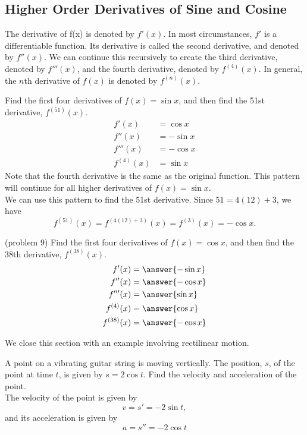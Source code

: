 \documentclass[handout]{ximera}
\begin{document}
\subsection{Higher Order Derivatives of Sine and Cosine}

The derivative of f(x) is denoted by $f'(x)$. In most circumstances, $f'$ is a differentiable function. Its derivative is called
 the second derivative, and denoted by $f''(x)$. 
 We can continue this recursively to create the third derivative, denoted by $f'''(x)$, and the fourth derivative, 
 denoted by $f^{(4)}(x)$.  In general, the $n$th derivative of $f(x)$ is denoted by $f^{(n)}(x)$. 

\begin{example}[example 9]
Find the first four derivatives of $f(x) = \sin x$, and then find the 51st derivative, $f^{(51)}(x)$.\\
\begin{align*}
f'(x) &= \cos x\\
f''(x) &= -\sin x\\
f'''(x) &= -\cos x\\
f^{(4)}(x) &= \sin x
\end{align*}  
Note that the fourth derivative is the same as the original function.  
This pattern will continue for all higher derivatives of $f(x) = \sin x$.  \\
We can use this pattern to find the 51st derivative.  Since $51 = 4(12) + 3$, we have
\[
f^{(51)}(x) = f^{(4(12)+3)}(x) = f^{(3)}(x) = -\cos x.
\]

  


\end{example}


\begin{problem}(problem 9)
Find the first four derivatives of $f(x) = \cos x$, and then find the 38th derivative, $f^{(38)}(x)$.
\begin{align}
f'(x) &= \answer{-\sin x}\\
f''(x) &= \answer{-\cos x}\\
f'''(x) &= \answer{\sin x}\\
f^{(4)}(x) &= \answer{\cos x}\\
f^{(38)}(x) &= \answer{-\cos x}
\end{align}

\end{problem}


We close this section with an example involving rectilinear motion.

\begin{example}
A point on a vibrating guitar string is moving vertically.
The position, $s$, of the point at time $t$, is given by $s = 2\cos t$.  Find the velocity and acceleration of the point.\\
The velocity of the point is given by 
\[
v = s' = -2\sin t,
\]
and its acceleration is given by 
\[
a = s'' = -2\cos t
\]

\end{example}
\end{document}
